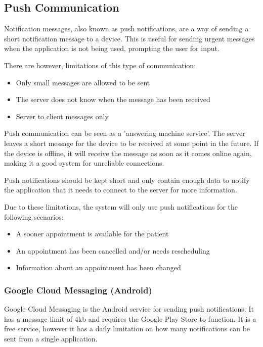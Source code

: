 \subsection{Push Communication}

Notification messages, also known as push notifications, are a way of sending a short notification message to a device. This is useful for sending urgent messages when the application is not being used, prompting the user for input.

There are however, limitations of this type of communication:

\begin{itemize}
	\item Only small messages are allowed to be sent
	\item The server does not know when the message has been received
	\item Server to client messages only
\end{itemize}

Push communication can be seen as a 'answering machine service'. The server leaves a short message for the device to be received at some point in the future. If the device is offline, it will receive the message as soon as it comes online again, making it a good system for unreliable connections.

Push notifications should be kept short and only contain enough data to notify the application that it needs to connect to the server for more information.

Due to these limitations, the system will only use push notifications for the following scenarios:

\begin{itemize}
	\item A sooner appointment is available for the patient
	\item An appointment has been cancelled and/or needs rescheduling
	\item Information about an appointment has been changed
\end{itemize}

\subsubsection{Google Cloud Messaging (Android)}

Google Cloud Messaging is the Android service for sending push notifications. It has a message limit of 4kb and requires the Google Play Store to function. It is a free service, however it has a daily limitation on how many notifications can be sent from a single application.


